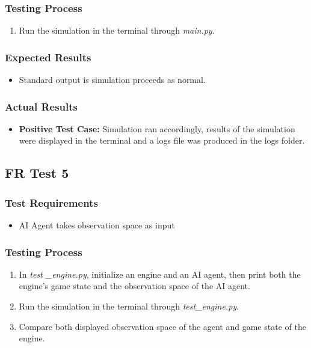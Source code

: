 \documentclass[12pt, titlepage]{article}
\providecommand{\DIFaddbegin}{} %
\providecommand{\DIFaddend}{} %
\begin{document}
\subsubsection{Testing Process}
\begin{enumerate}
    \item Run the simulation in the terminal through \textit{main.py}.
\end{enumerate}
\subsubsection{Expected Results}
\begin{itemize}
    \item Standard output is simulation proceeds as normal.
\end{itemize}
\subsubsection{Actual Results}
\begin{itemize}
    \item \textbf{Positive Test Case:} Simulation ran accordingly, results of the simulation were displayed in the terminal and a logs file was produced in the logs folder.
\end{itemize}

\subsection{FR Test 5}\DIFaddbegin \label{FRT5} 
\DIFaddend \subsubsection{Test Requirements}
\begin{itemize}
    \item AI Agent takes observation space as input
\end{itemize}
\subsubsection{Testing Process}
\begin{enumerate}
    \item In \textit{test
    \_engine.py}, initialize an engine and an AI agent, then print both the engine's game state and the observation space of the AI agent.
    \item Run the simulation in the terminal through \textit{test\_engine.py}.
    \item Compare both displayed observation space of the agent and game state of the engine.
\end{enumerate}
\end{document}
